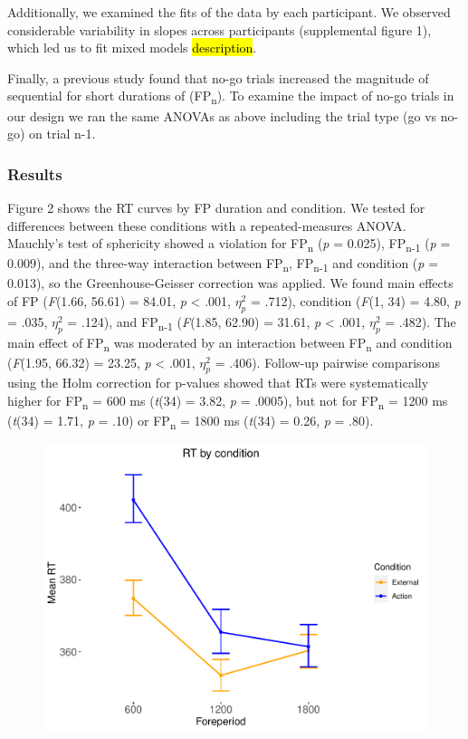 \documentclass{article}
\begin{document}
Additionally, we examined the fits of the data by each participant. We observed considerable variability in slopes across participants (supplemental figure 1), which led us to fit mixed models \hl{description}.

Finally, a previous study \cite{los_role_2013} found that no-go trials increased the magnitude of sequential for short durations of (FP\textsubscript{n}). To examine the impact of no-go trials in our design we ran the same ANOVAs as above including the trial type (go vs no-go) on trial n-1.

\subsubsection{Results}
Figure 2 shows the RT curves by FP duration and condition. We tested for differences between these conditions with a repeated-measures ANOVA. Mauchly's test of sphericity showed a violation for FP\textsubscript{n} (\textit{p} = 0.025), FP\textsubscript{n-1} (\textit{p} = 0.009), and the three-way interaction between FP\textsubscript{n}, FP\textsubscript{n-1} and condition (\textit{p} = 0.013), so the Greenhouse-Geisser correction was applied. We found main effects of FP (\textit{F}(1.66, 56.61) = 84.01, \textit{p} < .001, $\eta_{p}^{2}$ = .712), condition (\textit{F}(1, 34) = 4.80, \textit{p} = .035, $\eta_{p}^{2}$ = .124), and FP\textsubscript{n-1} (\textit{F}(1.85, 62.90) = 31.61, \textit{p} < .001, $\eta_{p}^{2}$ = .482). The main effect of FP\textsubscript{n} was moderated by an interaction between FP\textsubscript{n} and condition (\textit{F}(1.95, 66.32) = 23.25, \textit{p} < .001, $\eta_{p}^{2}$ = .406). Follow-up pairwise comparisons using the Holm correction for p-values showed that RTs were systematically higher for FP\textsubscript{n} = 600 ms (\textit{t}(34) = 3.82, \textit{p} = .0005), but not for FP\textsubscript{n} = 1200 ms (\textit{t}(34) = 1.71, \textit{p} = .10) or FP\textsubscript{n} = 1800 ms (\textit{t}(34) = 0.26, \textit{p} = .80).


\begin{figure}[h]
\includegraphics{RT_by_condition.pdf}
\centering
\end{figure}
\end{document}
